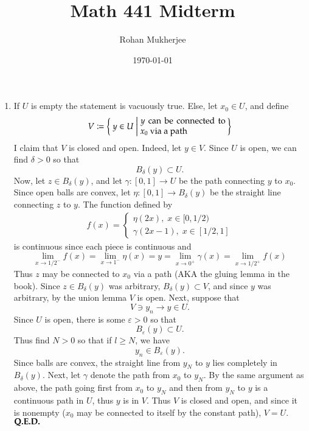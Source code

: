 \documentclass[12pt]{article}
\title{Math 441 Midterm}
\date{\today}
\author{Rohan Mukherjee}
\theoremstyle{definitionstyle}
\def \ve{\varepsilon}
\begin{document}
	\maketitle
	\begin{enumerate}[leftmargin=\labelsep]
		\item If $U$ is empty the statement is vacuously true. Else, let $x_0 \in U$, and define
		\begin{align*}
			V \coloneqq \Set{y \in U | \parbox{10em}{$y$ can be connected to $x_0$ via a path}}
		\end{align*}
		I claim that $V$ is closed and open. Indeed, let $y \in V$. Since $U$ is open, we can find $\delta > 0$ so that $$B_\delta(y) \subset U.$$
		Now, let $z \in B_\delta(y)$, and let $\gamma: [0,1] \to U$ be the path connecting $y$ to $x_0$. Since open balls are convex, let $\eta: [0,1] \to B_\delta(y)$ be the straight line connecting $z$ to $y$. The function defined by
		\begin{align*}
			f(x) = \begin{cases}
				\eta(2x), \; x \in [0, 1/2) \\
				\gamma(2x-1), \; x \in [1/2, 1]
			\end{cases}
		\end{align*}
		is continuous since each piece is continuous and
		$$\lim_{x \to 1/2^-} f(x) = \lim_{x \to 1^-} \eta(x) = y = \lim_{x \to 0^+} \gamma(x) = \lim_{x \to 1/2^+} f(x)$$
		Thus $z$ may be connected to $x_0$ via a path (AKA the gluing lemma in the book). Since $z \in B_\delta(y)$ was arbitrary, $B_\delta(y) \subset V$, and since $y$ was arbitrary, by the union lemma $V$ is open. Next, suppose that $$V \ni y_n \to y \in U.$$ Since $U$ is open, there is some $\ve > 0$ so that $$B_\ve(y) \subset U.$$ Thus find $N > 0$ so that if $l \geq N$, we have $$y_n \in B_\ve(y).$$ Since balls are convex, the straight line from $y_N$ to $y$ lies completely in $B_\delta(y)$. Next, let $\gamma$ denote the path from $x_0$ to $y_N$. By the same argument as above, the path going first from $x_0$ to $y_N$ and then from $y_N$ to $y$ is a continuous path in $U$, thus $y$ is in $V$. Thus $V$ is closed and open, and since it is nonempty ($x_0$ may be connected to itself by the constant path), $V = U$. $\hfill \textbf{Q.E.D.}$
		

\end{enumerate}
\end{document}
